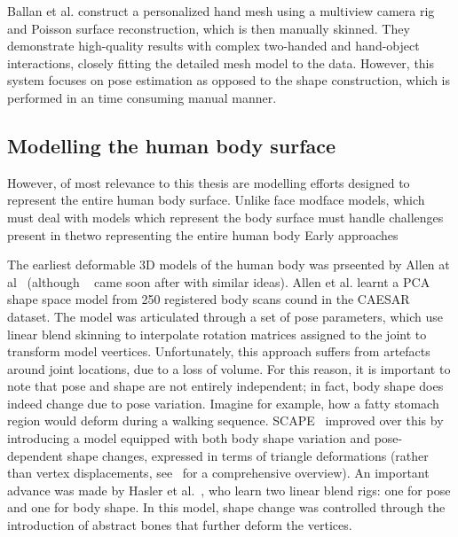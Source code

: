 Ballan et al. construct a personalized hand
mesh using a multiview camera rig and Poisson surface reconstruction, which is then manually skinned. They demonstrate high-quality results with complex two-handed and
hand-object interactions, closely fitting the detailed mesh
model to the data. However, this system focuses on pose
estimation as opposed to the shape construction, which is
performed in an time consuming manual manner.








\subsection{Modelling the human body surface}


However, of most relevance to this thesis are modelling efforts designed to represent the entire human body surface. Unlike face modface models, which must deal with models which represent the body surface must handle challenges present in thetwo representing the entire human body Early approaches 

The earliest deformable 3D models of the human body was prseented by Allen at al~\cite{xxx} (although ~\cite{xxx} came soon after with similar ideas). Allen et al. learnt a PCA shape space model from 250 registered body scans cound in the CAESAR dataset. The model was articulated through a set of pose parameters, which use linear blend skinning to interpolate rotation matrices assigned to the joint to transform model veertices. Unfortunately, this approach suffers from artefacts around joint locations, due to a loss of volume. For this reason, it is important to note that pose and shape are not entirely independent; in fact, body shape does indeed change due to pose variation. Imagine for example, how a fatty stomach region would deform during a walking sequence. SCAPE~\cite{anguelov05scape} improved over this by introducing a model equipped with both body shape variation and pose-dependent shape changes, expressed in terms of triangle deformations (rather than vertex displacements, see~\cite{loper15smpl} for a comprehensive overview). An important advance was made by Hasler et al.~\cite{xxx}, who learn two linear blend rigs: one for pose and one for body shape. In this model, shape change was controlled through the introduction of abstract bones that further deform the vertices.

